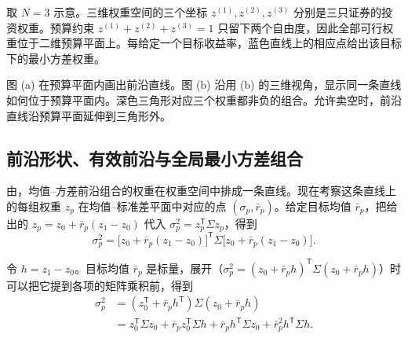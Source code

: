 取 $N=3$ 示意。三维权重空间的三个坐标 $z^{(1)},z^{(2)},z^{(3)}$ 分别是三只证券的投资权重。预算约束 $z^{(1)}+z^{(2)}+z^{(3)}=1$ 只留下两个自由度，因此全部可行权重位于二维预算平面上。每给定一个目标收益率，蓝色直线上的相应点给出该目标下的最小方差权重。

图 (a) 在预算平面内画出前沿直线。图 (b) 沿用 (b) 的三维视角，显示同一条直线如何位于预算平面内。深色三角形对应三个权重都非负的组合。允许卖空时，前沿直线沿预算平面延伸到三角形外。

\begin{center}
\begin{minipage}{\linewidth}
\centering
\renewcommand{\thewjFigure}{\thechapter.S\arabic{wjFigure}}%
%
\par
{}
\end{minipage}
\end{center}

\subsection{前沿形状、有效前沿与全局最小方差组合}
由，均值--方差前沿组合的权重在权重空间中排成一条直线。现在考察这条直线上的每组权重 $z_p$ 在均值--标准差平面中对应的点 $(\sigma_p,\bar r_p)$。给定目标均值 $\bar r_p$，把给出的 $z_p=z_0+\bar r_p(z_1-z_0)$ 代入 $\sigma_p^2=z_p^{\mathsf T}\Sigma z_p$，得到
\begin{equation}
 \sigma_p^2
 =\bigl[z_0+\bar r_p(z_1-z_0)\bigr]^{\mathsf T}
  \Sigma\bigl[z_0+\bar r_p(z_1-z_0)\bigr].
 \label{eq:wj-12-5}
\end{equation}

令 $h=z_1-z_0$。目标均值 $\bar r_p$ 是标量，展开（$\sigma_p^2=(z_0+\bar r_p h)^{\mathsf T}\Sigma(z_0+\bar r_p h)$）时可以把它提到各项的矩阵乘积前，得到
\[
 \begin{aligned}
 \sigma_p^2
 &=(z_0^{\mathsf T}+\bar r_p h^{\mathsf T})\Sigma(z_0+\bar r_p h)\\
 &=z_0^{\mathsf T}\Sigma z_0
   +\bar r_p z_0^{\mathsf T}\Sigma h
   +\bar r_p h^{\mathsf T}\Sigma z_0
   +\bar r_p^2 h^{\mathsf T}\Sigma h.
 \end{aligned}
\]


